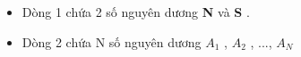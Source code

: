 \begin{itemize}
	\item Dòng 1 chứa 2 số nguyên dương \textbf{ N } và \textbf{ S } .
	\item Dòng 2 chứa N số nguyên dương \textbf{ $A_{1}$} , \textbf{ $A_{2}$} , ..., \textbf{ $A_{N}$}
\end{itemize}